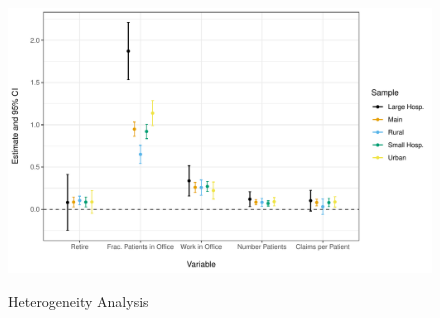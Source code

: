 \documentclass[12pt]{article}
\begin{document}
\begin{figure}
    \centering
    \caption{Heterogeneity Analysis}
    \includegraphics[scale=.6]{Objects/heterog_plot.pdf}
    \label{fig:heter}
\end{figure}
\end{document}
